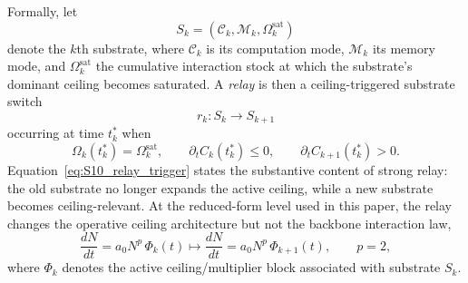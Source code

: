 \documentclass[11pt]{article}
\begin{document}
Formally, let
\begin{equation}
S_k=(\mathcal C_k,\mathcal M_k,\Omega_k^{\mathrm{sat}})
\label{eq:S10_substrate_def}
\end{equation}
denote the $k$th substrate, where $\mathcal C_k$ is its computation mode,
$\mathcal M_k$ its memory mode, and $\Omega_k^{\mathrm{sat}}$ the cumulative
interaction stock at which the substrate's dominant ceiling becomes saturated.
A \emph{relay} is then a ceiling-triggered substrate switch
\begin{equation}
r_k:S_k\longrightarrow S_{k+1}
\end{equation}
occurring at time $t_k^{\ast}$ when
\begin{equation}
\Omega_k(t_k^{\ast})=\Omega_k^{\mathrm{sat}},\qquad
\partial_t C_k(t_k^{\ast})\le 0,\qquad
\partial_t C_{k+1}(t_k^{\ast})>0.
\label{eq:S10_relay_trigger}
\end{equation}
Equation~\eqref{eq:S10_relay_trigger} states the substantive content of strong
relay: the old substrate no longer expands the active ceiling, while a new
substrate becomes ceiling-relevant. At the reduced-form level used in this
paper, the relay changes the operative ceiling architecture but not the
backbone interaction law,
\begin{equation}
\frac{dN}{dt}=a_0N^{p}\,\Phi_k(t)\longmapsto
\frac{dN}{dt}=a_0N^{p}\,\Phi_{k+1}(t),\qquad p=2,
\label{eq:S10_backbone_invariant}
\end{equation}
where $\Phi_k$ denotes the active ceiling/multiplier block associated with
substrate $S_k$.
\end{document}
